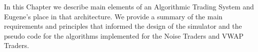 In this Chapter we describe main elements of an Algorithmic Trading System and Eugene’s place in that architecture. We provide a summary of the main requirements and principles that informed the design of the simulator and the pseudo code for the algorithms implemented for the Noise Traders and VWAP Traders.
